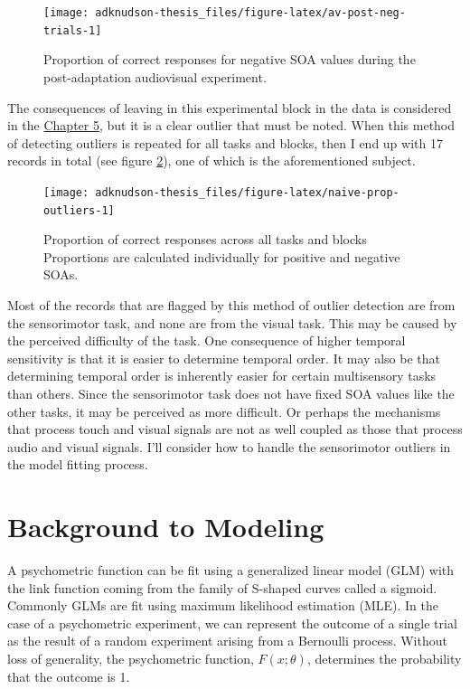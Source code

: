 \documentclass[11pt, oneside]{book}
\begin{document}
\begin{figure}

{\centering \texttt{[image: adknudson-thesis\_files/figure-latex/av-post-neg-trials-1]} 

}

\caption{Proportion of correct responses for negative SOA values during the post-adaptation audiovisual experiment.}\label{fig:av-post-neg-trials}
\end{figure}

The consequences of leaving in this experimental block in the data is considered in the \protect\hyperlink{workflow}{Chapter 5}, but it is a clear outlier that must be noted. When this method of detecting outliers is repeated for all tasks and blocks, then I end up with 17 records in total (see figure \ref{fig:naive-prop-outliers}), one of which is the aforementioned subject.

\begin{figure}

{\centering \texttt{[image: adknudson-thesis\_files/figure-latex/naive-prop-outliers-1]} 

}

\caption{Proportion of correct responses across all tasks and blocks Proportions are calculated individually for positive and negative SOAs.}\label{fig:naive-prop-outliers}
\end{figure}

Most of the records that are flagged by this method of outlier detection are from the sensorimotor task, and none are from the visual task. This may be caused by the perceived difficulty of the task. One consequence of higher temporal sensitivity is that it is easier to determine temporal order. It may also be that determining temporal order is inherently easier for certain multisensory tasks than others. Since the sensorimotor task does not have fixed SOA values like the other tasks, it may be perceived as more difficult. Or perhaps the mechanisms that process touch and visual signals are not as well coupled as those that process audio and visual signals. I'll consider how to handle the sensorimotor outliers in the model fitting process.

\hypertarget{background}{%
\chapter{Background to Modeling}\label{background}}

A psychometric function can be fit using a generalized linear model (GLM) with the link function coming from the family of S-shaped curves called a sigmoid. Commonly GLMs are fit using maximum likelihood estimation (MLE). In the case of a psychometric experiment, we can represent the outcome of a single trial as the result of a random experiment arising from a Bernoulli process. Without loss of generality, the psychometric function, \(F(x; \theta)\), determines the probability that the outcome is 1.
\end{document}
